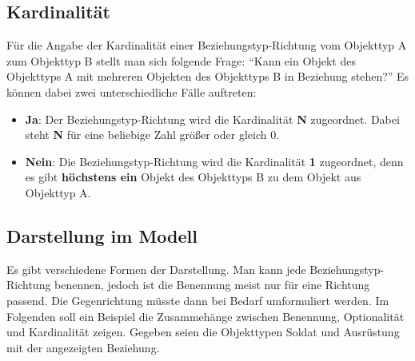        \subsection{Kardinalit\"at}
          F\"ur die Angabe der Kardinalit\"at einer Beziehungstyp-Richtung vom Objekttyp A zum Objekttyp B stellt man sich folgende Frage: \enquote{Kann ein Objekt des Objekttyps A mit mehreren Objekten des Objekttyps B in Beziehung stehen?} Es k\"onnen dabei zwei unterschiedliche F\"alle auftreten:
\clearpage
          \begin{itemize}
            \item \textbf{Ja}: Der Beziehungstyp-Richtung wird die Kardinalit\"at \textbf{N} zugeordnet. Dabei steht \textbf{N} f\"ur eine beliebige Zahl gr\"o\ss er oder gleich 0.
            \item \textbf{Nein}: Die Beziehungstyp-Richtung wird die Kardinalit\"at \textbf{1} zugeordnet, denn es gibt \textbf{h\"ochstens ein} Objekt des Objekttyps B zu dem Objekt aus Objekttyp A.
          \end{itemize}
        \subsection{Darstellung im Modell}
          Es gibt verschiedene Formen der Darstellung. Man kann jede Beziehungstyp-Richtung benennen, jedoch ist die Benennung meist nur f\"ur eine Richtung passend. Die Gegenrichtung m\"usste dann bei Bedarf umformuliert werden. Im Folgenden soll ein Beispiel die Zusammeh\"ange zwischen Benennung, Optionalit\"at und Kardinalit\"at zeigen. Gegeben seien die Objekttypen Soldat und Ausr\"ustung mit der angezeigten Beziehung.

